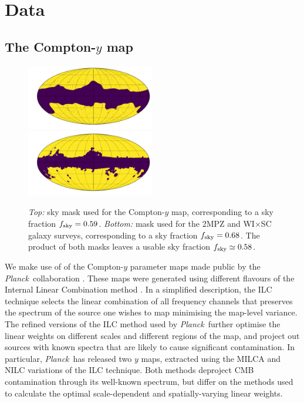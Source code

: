 \documentclass[useAMS,usenatbib]{mn2e}
\newcommand{\wisc}{WI$\times$SC}
\def\planck{{\it Planck\/}}
\begin{document}
\section{Data}\label{sec:data}
  \subsection{The Compton-$y$ map}\label{ssec:data.y}
    \begin{figure}
      \centering
      \includegraphics[width=0.5\textwidth]{mask_y.pdf}
      \includegraphics[width=0.5\textwidth]{mask_g.pdf}
      \caption{{\sl Top:} sky mask used for the Compton-$y$ map, corresponding to a sky fraction $f_{\rm sky}=0.59$. {\sl Bottom:} mask used for the 2MPZ and \wisc~ galaxy surveys, corresponding to a sky fraction $f_{\rm sky}=0.68$. The product of both masks leaves a usable sky fraction $f_{\rm sky}\simeq0.58$.
      }
      \label{fig:msk}
    \end{figure}
    We make use of of the Compton-$y$ parameter maps made public by the \planck\ collaboration \citep{2016A&A...594A..22P}. These maps were generated using different flavours of the Internal Linear Combination method \citep{2004ApJ...612..633E,2008arXiv0811.4277V}. In a simplified description, the ILC technique selects the linear combination of all frequency channels that preserves the spectrum of the source one wishes to map minimising the map-level variance. The refined versions of the ILC method used by \planck\ further optimise the linear weights on different scales and different regions of the map, and project out sources with known spectra that are likely to cause significant contamination. In particular, \planck\ has released two $y$ maps, extracted using the MILCA \citep{2013A&A...558A.118H} and NILC \citep{2011MNRAS.410.2481R} variations of the ILC technique. Both methods deproject CMB contamination through its well-known spectrum, but differ on the methods used to calculate the optimal scale-dependent and spatially-varying linear weights.
    
\end{document}
